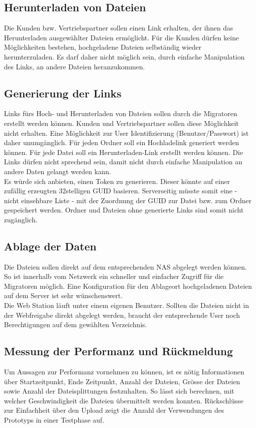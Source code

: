 \subsection{Herunterladen von Dateien}
Die Kunden bzw. Vertriebspartner sollen einen Link erhalten, der ihnen das Herunterladen ausgewählter Dateien ermöglicht.
Für die Kunden dürfen keine Möglichkeiten bestehen, hochgeladene Dateien selbständig wieder herunterzuladen. 
Es darf daher nicht möglich sein, durch einfache Manipulation des Links, an andere Dateien heranzukommen.

\subsection{Generierung der Links}\label{subsec:Links}
Links fürs Hoch- und Herunterladen von Dateien sollen durch die Migratoren erstellt werden können. Kunden und Vertriebspartner sollen diese Möglichkeit nicht erhalten. 
Eine Möglichkeit zur User Identifizierung (Benutzer/Passwort) ist daher unumgänglich.
Für jeden Ordner soll ein Hochladelink generiert werden können. Für jede Datei soll ein Herunterladen-Link erstellt werden können. 
Die Links dürfen nicht sprechend sein, damit nicht durch einfache Manipulation an andere Daten gelangt werden kann. 
\\ 
Es würde sich anbieten, einen Token zu generieren. Dieser könnte auf einer zufällig erzeugten 32stelligen GUID basieren.
Serverseitig müsste somit eine - nicht einsehbare Liste - mit der Zuordnung der GUID zur Datei bzw. zum Ordner gespeichert werden.
Ordner und Dateien ohne generierte Links sind somit nicht zugänglich.

\subsection{Ablage der Daten}
Die Dateien sollen direkt auf dem entsprechenden NAS abgelegt werden können. So ist innerhalb vom Netzwerk ein schneller und einfacher Zugriff für die Migratoren möglich.
Eine Konfiguration für den Ablageort hochgeladenen Dateien auf dem Server ist sehr wünschenswert.
\\
Die Web Station läuft unter einem eigenen Benutzer. 
Sollten die Dateien nicht in der Webfreigabe direkt abgelegt werden, braucht der entsprechende User noch Berechtigungen auf dem gewählten Verzeichnis.

\clearpage
\subsection{Messung der Performanz und Rückmeldung}
Um Aussagen zur Performanz vornehmen zu können, ist es nötig Informationen über Startzeitpunkt, Ende Zeitpunkt, Anzahl der Dateien, Grösse der Dateien sowie Anzahl der Dateisplittungen festzuhalten.
So lässt sich berechnen, mit welcher Geschwindigkeit die Dateien übermittelt werden konnten.
Rückschlüsse zur Einfachheit über den Upload zeigt die Anzahl der Verwendungen des Prototyps in einer Testphase auf.